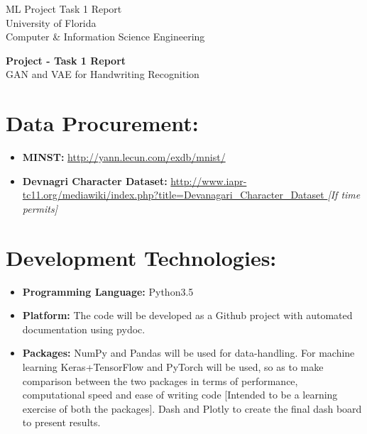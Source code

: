 \documentclass[11pt,usenames]{article}
\title{}
\date{}
\begin{document}
	
	
	\begin{center}
		{\sc ML Project Task 1 Report}\\
		University of Florida \\
		Computer \& Information Science Engineering
		\vspace{0.5 cm}
	\end{center}
	
	{\large \begin{center}
			\textbf{Project - Task 1 Report}\\
			GAN and VAE for Handwriting Recognition
	\end{center}}
	
	
	
	
	
	
	\newpage
	
	
	\section{Data Procurement:}\label{section:DataProcurement}
	\begin{itemize}
		\item \textbf{MINST:} \url{http://yann.lecun.com/exdb/mnist/}
		\item \textbf{Devnagri Character Dataset:} \url{http://www.iapr-tc11.org/mediawiki/index.php?title=Devanagari_Character_Dataset } \textit{[If time permits]}
	\end{itemize}	
	
	\section{Development Technologies:}\label{section:DevelopmentTechnologies}
	\begin{itemize}
	\item \textbf{Programming Language:} Python3.5
	\item \textbf{Platform:} The code will be developed as a Github project with automated documentation using pydoc.
	\item \textbf{Packages:} NumPy and Pandas will be used for data-handling. For machine learning Keras+TensorFlow and PyTorch will be used, so as to make comparison between the two packages in terms of performance, computational speed and ease of writing code [Intended to be a learning exercise of both the packages]. Dash and Plotly to create the final dash board to present results. 
	\end{itemize}		
	
\end{document}
